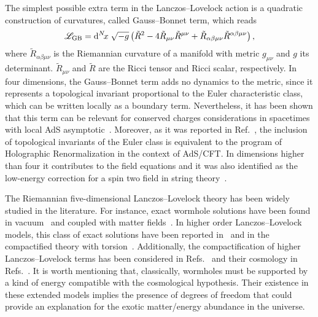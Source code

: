 \documentclass[aps,prd,12pt,superscriptaddress,showpacs,showkeys,longbibliography,reprint,nofootinbib]{revtex4-1}
\begin{document}
The simplest possible extra term in the Lanczos--Lovelock action  is a quadratic construction of curvatures, called Gauss--Bonnet term, which reads
\begin{equation}\label{GB}
  \mathcal{L}_{\mathrm{GB}} = {\mathrm{d}}^{N}\!{x}\;\sqrt{-g}\left(\tilde{R}^2-4\tilde{R}_{\mu\nu}\tilde{R}^{\mu\nu}+\tilde{R}_{\alpha\beta\mu\nu}
  \tilde{R}^{\alpha\beta\mu\nu}\right),
\end{equation}
where $\tilde{R}_{\alpha\beta\mu\nu}$ is the Riemannian curvature of a manifold with metric $g_{\mu\nu}$ and $g$ its determinant. $\tilde{R}_{\mu\nu}$ and $\tilde{R}$ are the Ricci tensor and Ricci scalar, respectively. In four dimensions, the Gauss--Bonnet term adds no dynamics to the metric, since it represents a topological invariant proportional to the Euler characteristic class, which can be written locally as a boundary term. Nevertheless, it has been shown that this term can be relevant for conserved charges considerations in spacetimes with local AdS asymptotic~\cite{Aros:1999id}. Moreover, as it was reported in Ref.~\cite{Miskovic:2009bm}, the inclusion of topological invariants of the Euler class is equivalent to the program of Holographic Renormalization in the context of AdS/CFT. In dimensions higher than four it contributes to the field equations and it was also identified as the low-energy correction for a spin two field in string theory~\cite{Zwiebach:1985uq}.

The Riemannian five-dimensional Lanczos--Lovelock theory has been widely studied in the literature. For instance, exact wormhole solutions have been found in vacuum~\cite{Dotti:2006cp,*Dotti:2007az} and coupled with matter fields~\cite{Mehdizadeh:2015jra}. In higher order Lanczos--Lovelock models, this class of exact solutions have been reported in~\cite{Mehdizadeh:2015dta} and in the compactified theory with torsion~\cite{Canfora:2008ka}. Additionally, the compactification of higher Lanczos--Lovelock terms has been considered in Refs.~\cite{MuellerHoissen:1985mm,*MuellerHoissen:1989yv} and their cosmology in Refs.~\cite{MuellerHoissen:1985ij,Deruelle:1986iv,Deruelle:1989fj}. It is worth mentioning that, classically, wormholes must be supported by a kind of energy compatible with the cosmological hypothesis. Their existence in these extended models implies the presence of degrees of freedom that could provide an explanation for the exotic matter/energy abundance in the universe.  
\end{document}
